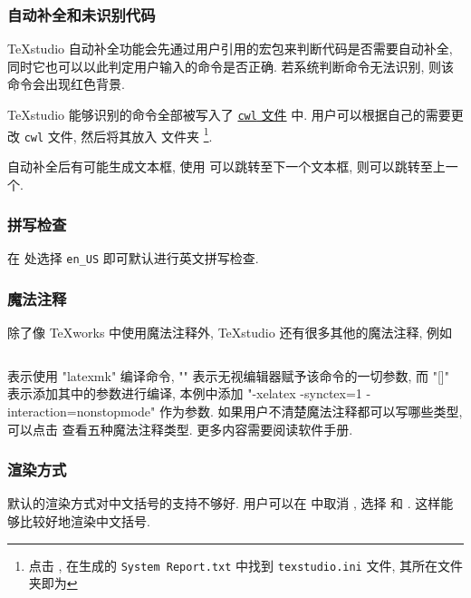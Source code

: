 \subsubsection{自动补全和未识别代码}

\TeX studio 自动补全功能会先通过用户引用的宏包来判断代码是否需要自动补全,
同时它也可以以此判定用户输入的命令是否正确.
若系统判断命令无法识别,
则该命令会出现红色背景.

\TeX studio 能够识别的命令全部被写入了
\href{https://github.com/texstudio-org/texstudio/tree/master/completion}{\texttt{cwl} 文件}
中.
用户可以根据自己的需要更改 \texttt{cwl} 文件,
然后将其放入
文件夹%
\footnote{点击 ,
在生成的 \texttt{System Report.txt} 中找到 \texttt{texstudio.ini} 文件,
其所在文件夹即为 }.

自动补全后有可能生成文本框,
使用 \keys{\ctrl + \arrowkey{>}} 可以跳转至下一个文本框,
\keys{\ctrl + \arrowkey{<}} 则可以跳转至上一个.

\subsubsection{拼写检查}

在
处选择 \texttt{en\_US} 即可默认进行英文拼写检查.

\subsubsection{魔法注释}

除了像 \TeX works 中使用魔法注释外, \TeX studio 还有很多其他的魔法注释, 例如
\begin{lstlisting}[language = {[LaTeX]TeX}]
  % !TeX TXS-program:compile = txs:///latexmk/{}[-xelatex -synctex=1 -interaction=nonstopmode ?me"]
\end{lstlisting}
表示使用 "latexmk" 编译命令,
"{}" 表示无视编辑器赋予该命令的一切参数,
而 "[]" 表示添加其中的参数进行编译,
本例中添加 "-xelatex -synctex=1 -interaction=nonstopmode" 作为参数.
如果用户不清楚魔法注释都可以写哪些类型,
可以点击  查看五种魔法注释类型.
更多内容需要阅读软件手册.

\subsubsection{渲染方式}

默认的渲染方式对中文括号的支持不够好.
用户可以在  中取消
,
选择  和 .
这样能够比较好地渲染中文括号.

